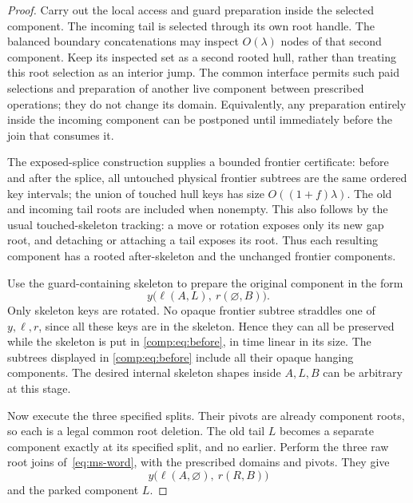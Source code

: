 \documentclass[11pt]{article}
\numberwithin{equation}{section}
\begin{document}
\begin{proof}
Carry out the local access and guard preparation inside the selected
component. The incoming tail is selected through its own root handle.
The balanced boundary concatenations may inspect $O(\lambda)$ nodes
of that second component. Keep its inspected set as a second rooted
hull, rather than treating this root selection as an interior jump.
The common interface permits such paid selections and preparation of
another live component between prescribed operations; they do not
change its domain. Equivalently, any preparation entirely inside the
incoming component can be postponed until immediately before the join
that consumes it.

The exposed-splice construction supplies a bounded frontier certificate:
before and after the splice, all untouched physical frontier subtrees
are the same ordered key intervals; the union of touched hull keys
has size $O((1+f)\lambda)$. The old and incoming tail roots are included
when nonempty. This also follows by the usual touched-skeleton tracking:
a move or rotation exposes only its new gap root, and detaching or
attaching a tail exposes its root. Thus each resulting component has
a rooted after-skeleton and the unchanged frontier components.

Use the guard-containing skeleton to prepare the original component
in the form
\begin{equation}\label{comp:eq:before}
y\bigl(\ell(A,L),\ r(\varnothing,B)\bigr).
\end{equation}
Only skeleton keys are rotated. No opaque frontier subtree straddles
one of $y,\ell,r$, since all these keys are in the skeleton. Hence
they can all be preserved while the skeleton is put in \eqref{comp:eq:before}, in time
linear in its size. The subtrees displayed in \eqref{comp:eq:before} include all their
opaque hanging components. The desired internal skeleton shapes
inside $A,L,B$ can be arbitrary at this stage.

Now execute the three specified splits. Their pivots are already
component roots, so each is a legal common root deletion. The old
tail $L$ becomes a separate component exactly at its specified split,
and no earlier. Perform the three raw root joins of~\eqref{eq:ms-word}, with the
prescribed domains and pivots. They give
\begin{equation}\label{comp:eq:after}
y\bigl(\ell(A,\varnothing),\ r(R,B)\bigr)
\end{equation}
and the parked component $L$.


\end{proof}
\end{document}
